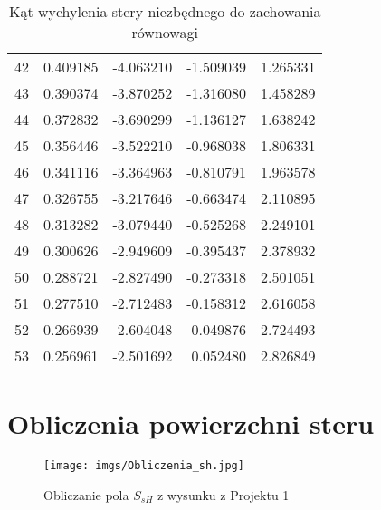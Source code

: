 \documentclass[12pt]{sprawozdanie}
\begin{document}
\begin{table}[h!]
\begin{tabular}{rrrrr}
        42  &  0.409185 &  -4.063210 &  -1.509039 &  1.265331 \\
        43  &  0.390374 &  -3.870252 &  -1.316080 &  1.458289 \\
        44  &  0.372832 &  -3.690299 &  -1.136127 &  1.638242 \\
        45  &  0.356446 &  -3.522210 &  -0.968038 &  1.806331 \\
        46  &  0.341116 &  -3.364963 &  -0.810791 &  1.963578 \\
        47  &  0.326755 &  -3.217646 &  -0.663474 &  2.110895 \\
        48  &  0.313282 &  -3.079440 &  -0.525268 &  2.249101 \\
        49  &  0.300626 &  -2.949609 &  -0.395437 &  2.378932 \\
        50  &  0.288721 &  -2.827490 &  -0.273318 &  2.501051 \\
        51  &  0.277510 &  -2.712483 &  -0.158312 &  2.616058 \\
        52  &  0.266939 &  -2.604048 &  -0.049876 &  2.724493 \\
        53  &  0.256961 &  -2.501692 &   0.052480 &  2.826849 \\
        \bottomrule
        \end{tabular}
    \caption{Kąt wychylenia stery niezbędnego do zachowania równowagi}
    \label{tab:deltahv}        
\end{table}
\FloatBarrier


\appendix
\chapter{Obliczenia powierzchni steru}\label{appendix:obl}
\begin{figure}[h!]
    \centering
    \texttt{[image: imgs/Obliczenia\_sh.jpg]}
    \caption{Obliczanie pola $S_{sH}$ z wysunku z Projektu 1 \cite{Proj1}}
    \label{fig:SsH}
\end{figure}
\FloatBarrier



\end{document}
